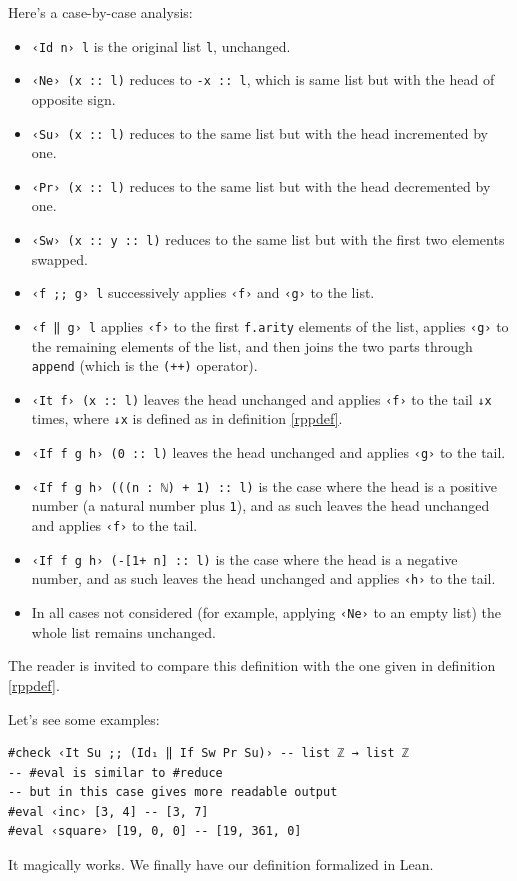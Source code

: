 \documentclass{book}
\theoremstyle{definition}
\theoremstyle{remark}
\theoremstyle{plain}
\begin{document}
Here's a case-by-case analysis:
\begin{itemize}
\item \lstinline{‹Id n› l} is the original list \lstinline{l}, unchanged.
\item \lstinline{‹Ne› (x :: l)} reduces to \lstinline{-x :: l}, which is same list but with the head of opposite sign.
\item \lstinline{‹Su› (x :: l)} reduces to the same list but with the head incremented by one.
\item \lstinline{‹Pr› (x :: l)} reduces to the same list but with the head decremented by one.
\item \lstinline{‹Sw› (x :: y :: l)} reduces to the same list but with the first two elements swapped.
\item \lstinline{‹f ;; g› l} successively applies \lstinline{‹f›} and \lstinline{‹g›} to the list.
\item \lstinline{‹f ‖ g› l} applies \lstinline{‹f›} to the first \lstinline{f.arity} elements of the list,
applies \lstinline{‹g›} to the remaining elements of the list,
and then joins the two parts through \lstinline{append} (which is the \lstinline{(++)} operator).
\item \lstinline{‹It f› (x :: l)} leaves the head unchanged and applies \lstinline{‹f›} to the tail \lstinline{↓x} times,
where \lstinline{↓x} is defined as in definition \ref{rppdef}.
\item \lstinline{‹If f g h› (0 :: l)} leaves the head unchanged and applies \lstinline{‹g›} to the tail.
\item \lstinline{‹If f g h› (((n : ℕ) + 1) :: l)} is the case where the head is a positive number
(a natural number plus \lstinline{1}),
and as such leaves the head unchanged and applies \lstinline{‹f›} to the tail.
\item \lstinline{‹If f g h› (-[1+ n] :: l)} is the case where the head is a negative number,
and as such leaves the head unchanged and applies \lstinline{‹h›} to the tail.
\item In all cases not considered (for example, applying \lstinline{‹Ne›} to an empty list) the whole list remains unchanged. 
\end{itemize}

The reader is invited to compare this definition with the one given in definition \ref{rppdef}.

Let's see some examples:
\begin{lstlisting}
#check ‹It Su ;; (Id₁ ‖ If Sw Pr Su)› -- list ℤ → list ℤ
-- #eval is similar to #reduce
-- but in this case gives more readable output
#eval ‹inc› [3, 4] -- [3, 7]
#eval ‹square› [19, 0, 0] -- [19, 361, 0]
\end{lstlisting}
It magically works. We finally have our definition formalized in Lean.
\end{document}
